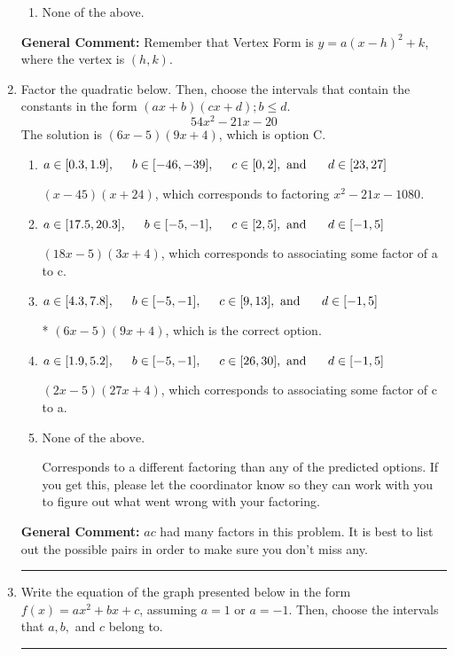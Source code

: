 \documentclass{extbook}[14pt]
\newcommand{\litem}[1]{\item #1

\rule{\textwidth}{0.4pt}}
\begin{document}
\begin{enumerate}
{\begin{enumerate}[label=\Alph*.]
\begin{multicols}{2}
\end{multicols}\item None of the above.\end{enumerate}
\textbf{General Comment:} Remember that Vertex Form is $y = a(x-h)^2+k$, where the vertex is $(h, k)$.
}
\litem{
Factor the quadratic below. Then, choose the intervals that contain the constants in the form $(ax+b)(cx+d); b \leq d.$
\[ 54x^{2} -21 x -20 \]The solution is \( (6x -5)(9x + 4) \), which is option C.\begin{enumerate}[label=\Alph*.]
\item \( a \in [0.3, 1.9], \hspace*{5mm} b \in [-46, -39], \hspace*{5mm} c \in [0, 2], \text{ and } \hspace*{5mm} d \in [23, 27] \)

 $(x -45)(x + 24)$, which corresponds to factoring $x^{2} -21 x -1080$.
\item \( a \in [17.5, 20.3], \hspace*{5mm} b \in [-5, -1], \hspace*{5mm} c \in [2, 5], \text{ and } \hspace*{5mm} d \in [-1, 5] \)

 $(18x -5)(3x + 4)$, which corresponds to associating some factor of a to c.
\item \( a \in [4.3, 7.8], \hspace*{5mm} b \in [-5, -1], \hspace*{5mm} c \in [9, 13], \text{ and } \hspace*{5mm} d \in [-1, 5] \)

* $(6x -5)(9x + 4)$, which is the correct option.
\item \( a \in [1.9, 5.2], \hspace*{5mm} b \in [-5, -1], \hspace*{5mm} c \in [26, 30], \text{ and } \hspace*{5mm} d \in [-1, 5] \)

 $(2x -5)(27x + 4)$, which corresponds to associating some factor of c to a.
\item \( \text{None of the above.} \)

 Corresponds to a different factoring than any of the predicted options. If you get this, please let the coordinator know so they can work with you to figure out what went wrong with your factoring.
\end{enumerate}

\textbf{General Comment:} $ac$ had many factors in this problem. It is best to list out the possible pairs in order to make sure you don't miss any.
}
\litem{
Write the equation of the graph presented below in the form $f(x)=ax^2+bx+c$, assuming  $a=1$ or $a=-1$. Then, choose the intervals that $a, b,$ and $c$ belong to.

}
\end{enumerate}
\end{document}
